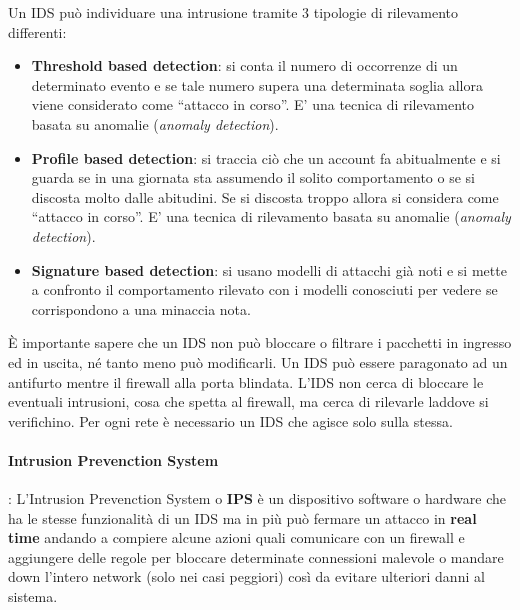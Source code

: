 Un IDS può individuare una intrusione tramite 3 tipologie di rilevamento differenti:
\begin{itemize}
	\item \textbf{Threshold based detection}: si conta il numero di occorrenze di un determinato evento e se tale numero supera una determinata soglia allora viene considerato come ``attacco in corso''. E' una tecnica di rilevamento basata su anomalie (\emph{anomaly detection}).
	\item \textbf{Profile based detection}: si traccia ciò che un account fa abitualmente e si guarda se in una giornata sta assumendo il solito comportamento o se si discosta molto dalle abitudini. Se si discosta troppo allora si considera come ``attacco in corso''.  E' una tecnica di rilevamento basata su anomalie (\emph{anomaly detection}).
	\item \textbf{Signature based detection}: si usano modelli di attacchi già noti e si mette a confronto il comportamento rilevato con i modelli conosciuti per vedere se corrispondono a una minaccia nota.
\end{itemize}

È importante sapere che un IDS non può bloccare o filtrare i pacchetti in ingresso ed in uscita, né tanto meno può modificarli. Un IDS può essere paragonato ad un antifurto mentre il firewall alla porta blindata. L'IDS non cerca di bloccare le eventuali intrusioni, cosa che spetta al firewall, ma cerca di rilevarle laddove si verifichino.
Per ogni rete è necessario un IDS che agisce solo sulla stessa. 

\paragraph{Intrusion Prevenction System}: L'Intrusion Prevenction System o \textbf{IPS} è un dispositivo software o hardware che ha le stesse funzionalità di un IDS ma in più può fermare un attacco in \textbf{real time} andando a compiere alcune azioni quali comunicare con un firewall e aggiungere delle regole per bloccare determinate connessioni malevole o mandare down l'intero network (solo nei casi peggiori) così da evitare ulteriori danni al sistema.


